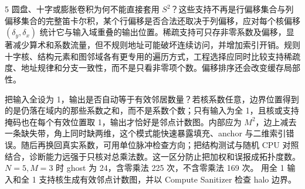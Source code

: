 \begin{solutionexercise}{5}
圆盘、十字或膨胀卷积为何不能直接套用 $S^2$？这些支持不再是行偏移集合与列偏移集合的完整笛卡尔积，某个行偏移是否合法还取决于列偏移，应对每个核偏移 $(\delta_y,\delta_x)$ 统计它与输入域重叠的输出位置。稀疏支持可只存非零系数及偏移，显著减少算术和系数流量，但不规则地址可能破坏连续访问，并增加索引开销。规则十字核、结构元素和图邻域各有更专用的遍历方式，工程选择应同时比较支持稀疏度、地址规律和分支一致性，而不是只看非零项个数。偏移排序还会改变缓存局部性。

把输入全设为 1，输出是否自动等于有效邻居数量？若核系数任意，边界位置得到的是仍落在域内的那些系数之和，而不是系数个数；只有输入为全 1，且核或支持掩码也在每个有效位置取 1，输出才恰好是邻点计数图。内部应为 $M^2$，边上减去一条缺失带，角上同时缺两维，这个模式能快速暴露填充、anchor 与二维索引错误。随后再换回真实系数，可用单位脉冲检查方向；把结构测试与随机 CPU 对照结合，诊断能力远强于只核对总乘法数。这一区分防止把加权和误报成拓扑度数。
\variantheading $N=5,M=3$ 时 ghost 为 24，含零乘法 225 次，不含零乘法 169 次。
\practiceheading 用全 1 输入和全 1 支持核生成有效邻点计数图，并以 Compute Sanitizer 检查 halo 边界。
\end{solutionexercise}

